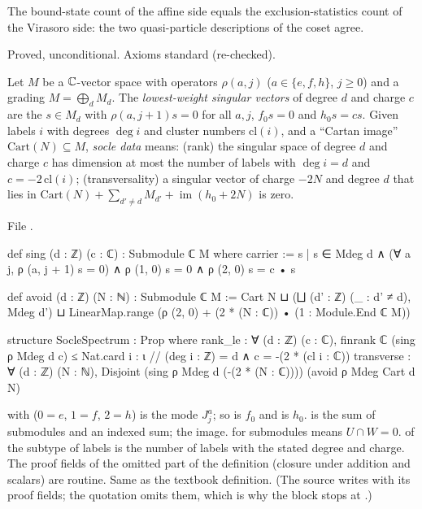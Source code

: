 \begin{physics}
The bound-state count of the affine side equals the exclusion-statistics count of the Virasoro side: the two
quasi-particle descriptions of the coset agree.
\end{physics}

\begin{status}
Proved, unconditional. Axioms standard (re-checked).
\end{status}

\begin{definition}\label{l29:def:soclespectrum}
Let $M$ be a ${\mathbb{C}}$-vector space with operators $\rho(a,j)$ ($a\in\{e,f,h\}$, $j\ge0$) and a grading $M=\bigoplus_dM_d$.
The \emph{lowest-weight singular vectors} of degree $d$ and charge $c$ are the $s\in M_d$ with $\rho(a,j+1)s=0$ for all
$a,j$, $f_0s=0$ and $h_0s=cs$. Given labels $i$ with degrees $\deg i$ and cluster numbers $\mathrm{cl}(i)$, and a
``Cartan image'' $\mathrm{Cart}(N)\subseteq M$, \emph{socle data} means: (rank) the singular space of degree $d$ and
charge $c$ has dimension at most the number of labels with $\deg i=d$ and $c=-2\,\mathrm{cl}(i)$; (transversality) a
singular vector of charge $-2N$ and degree $d$ that lies in $\mathrm{Cart}(N)+\sum_{d'\ne d}M_{d'}+\operatorname{im}(h_0+2N)$
is zero.
\end{definition}

\noindent File .
\begin{leancode}
def sing (d : ℤ) (c : ℂ) : Submodule ℂ M where
  carrier := {s | s ∈ Mdeg d ∧ (∀ a j, ρ (a, j + 1) s = 0) ∧ ρ (1, 0) s = 0 ∧
    ρ (2, 0) s = c • s}

def avoid (d : ℤ) (N : ℕ) : Submodule ℂ M :=
  Cart N ⊔ (⨆ (d' : ℤ) (_ : d' ≠ d), Mdeg d') ⊔
    LinearMap.range (ρ (2, 0) + (2 * (N : ℂ)) • (1 : Module.End ℂ M))

structure SocleSpectrum : Prop where
  rank_le : ∀ (d : ℤ) (c : ℂ), finrank ℂ (sing ρ Mdeg d c) ≤
    Nat.card {i : ι // (deg i : ℤ) = d ∧ c = -(2 * (cl i : ℂ))}
  transverse : ∀ (d : ℤ) (N : ℕ),
    Disjoint (sing ρ Mdeg d (-(2 * (N : ℂ)))) (avoid ρ Mdeg Cart d N)
\end{leancode}

\begin{dictionary}
 with  ($0=e$, $1=f$, $2=h$) is the mode $J^a_j$; so  is $f_0$ and
 is $h_0$.  is the sum of submodules and  an indexed sum;  the
image.  for submodules means $U\cap W=0$.  of the subtype of labels is the number of
labels with the stated degree and charge. The proof fields of the omitted part of the definition (closure under
addition and scalars) are routine. Same as the textbook definition. (The source writes  with its proof
fields; the quotation omits them, which is why the block stops at .)
\end{dictionary}

